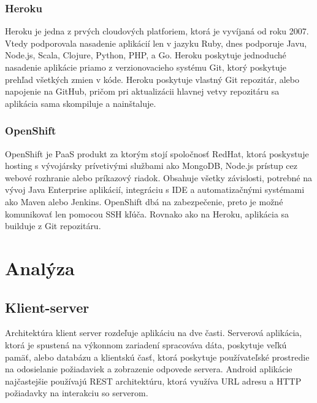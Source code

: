 \subsection{Heroku}
Heroku je jedna z prvých cloudových platforiem, ktorá je vyvíjaná od roku 2007. Vtedy podporovala nasadenie aplikácií len v jazyku Ruby, dnes podporuje  Javu, Node.js, Scala, Clojure, Python, PHP, a Go. Heroku poskytuje jednoduché nasadenie aplikácie priamo z verzionovacieho systému Git, ktorý poskytuje prehľad všetkých zmien v kóde. Heroku poskytuje vlastný Git repozitár, alebo napojenie na GitHub, pričom pri aktualizácii hlavnej vetvy repozitáru sa aplikácia sama skompiluje a nainštaluje. \cite{heroku}

\subsection{OpenShift}
OpenShift je PaaS produkt za ktorým stojí spoločnosť RedHat, ktorá poskystuje hosting s vývojársky prívetivými službami ako MongoDB, Node.js prístup cez webové rozhranie alebo príkazový riadok. Obsahuje všetky závislosti, potrebné na vývoj  Java Enterprise aplikácií, integráciu s IDE a automatizačnými systémami ako Maven alebo Jenkins. OpenShift dbá na zabezpečenie, preto je možné komunikovať len pomocou SSH kľúča. Rovnako ako na Heroku, aplikácia sa builduje z Git repozitáru. 

\chapter{Analýza}

\section{Klient-server} 
Architektúra klient server rozdeľuje aplikáciu na dve časti. Serverová aplikácia, ktorá je spustená na výkonnom zariadení spracováva dáta, poskytuje veľkú pamäť, alebo databázu a klientskú časť, ktorá poskytuje používateľské prostredie na odosielanie požiadaviek a zobrazenie odpovede servera\cite{clientserver}. Android aplikácie najčastejšie používajú REST architektúru, ktorá využíva URL adresu a HTTP požiadavky na interakciu so serverom. 

